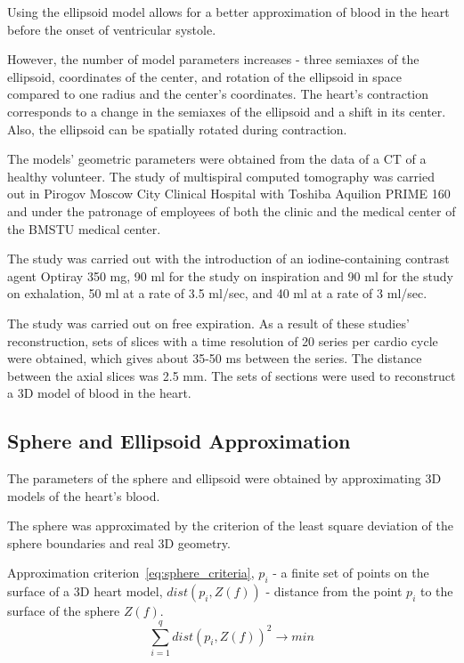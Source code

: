 \documentclass[conference]{IEEEtran}
\begin{document}
Using the ellipsoid model allows for a better approximation of blood in the
heart before the onset of ventricular systole.

However, the number of model parameters increases - three semiaxes of the
ellipsoid, coordinates of the center, and rotation of the ellipsoid in space
compared to one radius and the center's coordinates. The heart's contraction
corresponds to a change in the semiaxes of the ellipsoid and a shift in its
center. Also, the ellipsoid can be spatially rotated during contraction.

The models' geometric parameters were obtained from the data of a CT of a
healthy volunteer. The study of multispiral computed tomography was carried out
in Pirogov Moscow City Clinical Hospital  with  Toshiba Aquilion PRIME 160
and under the patronage of employees of both the clinic and the medical center
of the BMSTU medical center.

The study was carried out with the introduction of an iodine-containing contrast
agent Optiray 350 mg, 90 ml for the study on inspiration and 90 ml for the study
on exhalation, 50 ml at a rate of 3.5 ml/sec, and 40 ml at a rate of 3 ml/sec.

The study was carried out on free expiration. As a result of these studies'
reconstruction, sets of slices with a time resolution of 20 series per cardio
cycle were obtained, which gives about 35-50 ms between the series. The distance
between the axial slices was 2.5 mm. The sets of sections were used to
reconstruct a 3D model of blood in the heart.

\subsection{Sphere and Ellipsoid Approximation}
The parameters of the sphere and ellipsoid were obtained by approximating 3D models of the heart's blood.

The sphere was approximated by the criterion of the least square deviation of the sphere boundaries and real 3D geometry.

Approximation criterion~\ref{eq:sphere_criteria},
$p_i$ - a finite set of points on the surface of a 3D heart model,
$dist(p_i,Z(f))$ -  distance from the point $p_i$ to the surface of the sphere $Z(f)$.
\begin{equation}
    \sum_{i=1}^{q}dist(p_i,Z(f))^2 \rightarrow min
    \label{eq:sphere_criteria}
\end{equation}
\end{document}
